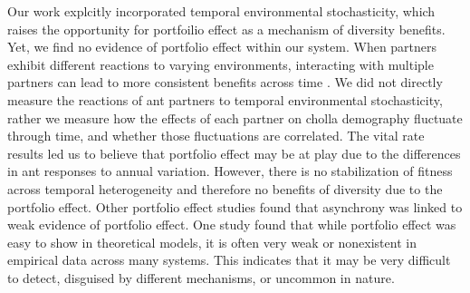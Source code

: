\documentclass[11pt]{article}
\begin{document}
Our work explcitly incorporated temporal environmental stochasticity, which raises the opportunity for portfoilio effect as a mechanism of diversity benefits. 
Yet, we find no evidence of portfolio effect within our system. 
When partners exhibit different reactions to varying environments, interacting with multiple partners can lead to more consistent benefits across time \citep{Batstone2018}.
We did not directly measure the reactions of ant partners to temporal environmental stochasticity, rather we measure how the effects of each partner on cholla demography fluctuate through time, and whether those fluctuations are correlated.
The vital rate results led us to believe that portfolio effect may be at play due to the differences in ant responses to annual variation.
However, there is no stabilization of fitness across temporal heterogeneity and therefore no benefits of diversity due to the portfolio effect.
Other portfolio effect studies \citep{Lazaro2022,Tornos2023} found that asynchrony was linked to weak evidence of portfolio effect.
One study \cite{dallas2022temporal} found that while portfolio effect was easy to show in theoretical models, it is often very weak or nonexistent in empirical data across many systems. 
This indicates that it may be very difficult to detect, disguised by different mechanisms, or uncommon in nature.
\end{document}
